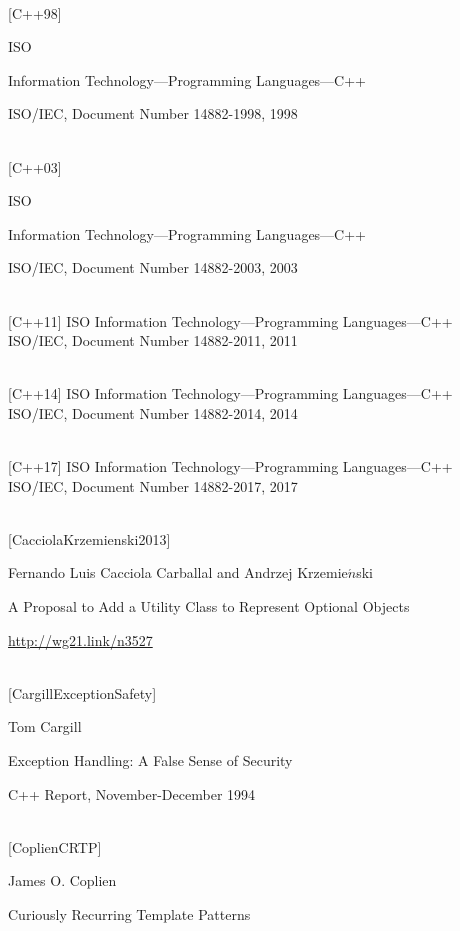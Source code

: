\hspace*{\fill} \\ %
{[C++98]}

ISO

Information Technology—Programming Languages—C++

ISO/IEC, Document Number 14882-1998, 1998

\hspace*{\fill} \\ %
{[C++03]}

ISO

Information Technology—Programming Languages—C++

ISO/IEC, Document Number 14882-2003, 2003

\hspace*{\fill} \\ %
{[C++11]}
ISO
Information Technology—Programming Languages—C++
ISO/IEC, Document Number 14882-2011, 2011

\hspace*{\fill} \\ %
{[C++14]}
ISO
Information Technology—Programming Languages—C++
ISO/IEC, Document Number 14882-2014, 2014

\hspace*{\fill} \\ %
{[C++17]}
ISO
Information Technology—Programming Languages—C++
ISO/IEC, Document Number 14882-2017, 2017

\hspace*{\fill} \\ %
{[CacciolaKrzemienski2013]}

Fernando Luis Cacciola Carballal and Andrzej Krzemie$\acute{n}$ski

A Proposal to Add a Utility Class to Represent Optional Objects

\url{http://wg21.link/n3527}

\hspace*{\fill} \\ %
{[CargillExceptionSafety]}

Tom Cargill

Exception Handling: A False Sense of Security

C++ Report, November-December 1994

\hspace*{\fill} \\ %
{[CoplienCRTP]}

James O. Coplien

Curiously Recurring Template Patterns

